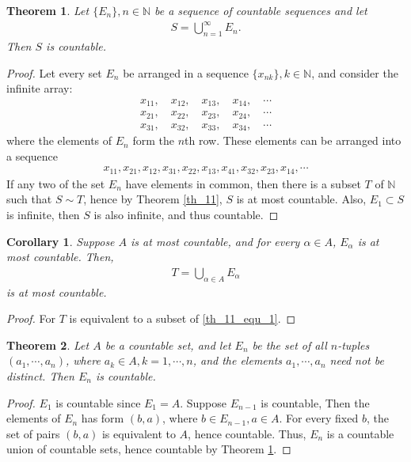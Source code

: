 \documentclass[11pt]{book}
\newtheorem{theorem}{Theorem}[chapter]
\newtheorem{corollary}{Corollary}[theorem]
\theoremstyle{definition}
\numberwithin{equation}{chapter}
\begin{document}
\medskip

\begin{theorem}\label{th_12}
Let $\{E_n\}, n \in \mathbb{N}$ be a sequence of countable sequences and let 
\begin{align}\label{th_11_equ_1}
    S = \bigcup^\infty_{n=1} E_n.
\end{align}
Then $S$ is countable.
\end{theorem}
\begin{proof}
Let every set $E_n$ be arranged in a sequence $\{x_{nk}\}, k \in \mathbb{N}$, and consider the infinite array:
\begin{align*}
    x_{11}, \quad x_{12}, \quad x_{13}, \quad x_{14}, \quad \cdots \\
    x_{21}, \quad x_{22}, \quad x_{23}, \quad x_{24}, \quad \cdots \\
    x_{31}, \quad x_{32}, \quad x_{33}, \quad x_{34}, \quad \cdots
\end{align*}
where the elements of $E_n$ form the $n$th row. These elements can be arranged into a sequence
\begin{align*}
    x_{11}, x_{21}, x_{12}, x_{31}, x_{22}, x_{13}, x_{41}, x_{32}, x_{23}, x_{14}, \cdots
\end{align*}
If any two of the set $E_n$ have elements in common, then there is a subset $T$ of $\mathbb{N}$ such that $S \sim T$, hence by Theorem \ref{th_11}, $S$ is at most countable. Also, $E_1 \subset S$ is infinite, then $S$ is also infinite, and thus countable.
\end{proof}

\medskip

\begin{corollary}
Suppose $A$ is at most countable, and for every $\alpha \in A$, $E_{\alpha}$ is at most countable. Then,
\begin{align*}
    T = \bigcup_{\alpha \in A} E_{\alpha}
\end{align*}
is at most countable.
\end{corollary}
\begin{proof}
For $T$ is equivalent to a subset of \eqref{th_11_equ_1}.
\end{proof}

\medskip

\begin{theorem}\label{th_13}
Let $A$ be a countable set, and let $E_n$ be the set of all $n$-tuples $(a_1, \cdots, a_n)$, where $a_k \in A, k = 1, \cdots, n$, and the elements $a_1, \cdots, a_n$ need not be distinct. Then $E_n$ is countable.
\end{theorem}
\begin{proof}
$E_1$ is countable since $E_1 = A$. Suppose $E_{n-1}$ is countable, Then the elements of $E_n$ has form $(b,a)$, where $b \in E_{n-1}, a \in A$. For every fixed $b$, the set of pairs $(b,a)$ is equivalent to $A$, hence countable. Thus, $E_n$ is a countable union of countable sets, hence countable by Theorem \ref{th_12}.
\end{proof}
\end{document}
